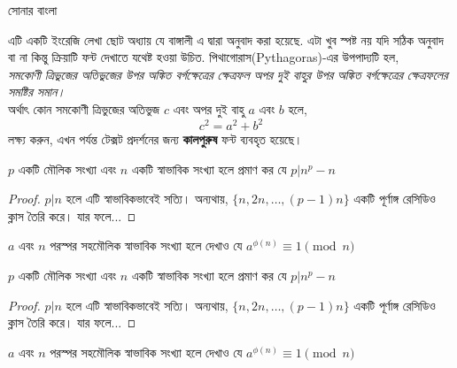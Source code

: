 \documentclass{article}
\begin{document}
{\Large সোনার বাংলা}\

এটি একটি ইংরেজি লেখা ছোট অধ্যায় যে বাঙ্গালী এ দ্বারা অনুবাদ করা হয়েছে. এটা খুব স্পষ্ট নয় যদি সঠিক অনুবাদ বা না কিন্তু ক্রিয়াটি ফন্ট দেখাতে যথেষ্ট হওয়া উচিত.
পিথাগোরাস(Pythagoras)-এর উপপাদ্যটি হল,\\
\textit{সমকোণী ত্রিভুজের অতিভুজের উপর অঙ্কিত বর্গক্ষেত্রের ক্ষেত্রফল অপর দুই বাহুর 
উপর অঙ্কিত বর্গক্ষেত্রের ক্ষেত্রফলের সমষ্টির সমান।}\\
অর্থাৎ কোন সমকোণী ত্রিভুজের অতিভুজ $c$ এবং অপর দুই বাহু $a$ এবং $b$ হলে,
\[c^2=a^2+b^2\]
লক্ষ্য করুন, এখন পর্যন্ত টেক্সট প্রদর্শনের জন্য \textbf{কালপুরুষ} ফন্ট ব্যবহৃত হয়েছে।


\begin{problem}
$p$ একটি মৌলিক সংখ্যা এবং $n$ একটি স্বাভাবিক সংখ্যা হলে প্রমাণ কর যে 
$p|n^p-n$ 
\end{problem}
\begin{proof}
$p|n$ হলে এটি স্বাভাবিকভাবেই সত্যি। অন্যথায়, $\{n,2n,\ldots,(p-1)n\}$
 একটি পূর্ণাঙ্গ রেসিডিও ক্লাস তৈরি করে। যার ফলে...
\end{proof}
\begin{problem}
$a$ এবং $n$ পরস্পর সহমৌলিক স্বাভাবিক সংখ্যা হলে দেখাও যে $a^{\phi(n)}
\equiv 1\pmod n$
\end{problem}

\begin{problem}
$p$ একটি মৌলিক সংখ্যা এবং $n$ একটি স্বাভাবিক সংখ্যা হলে প্রমাণ কর যে $p|n^p-n$ 
\end{problem}
\begin{proof}
$p|n$ হলে এটি স্বাভাবিকভাবেই সত্যি। অন্যথায়, $\{n,2n,\ldots,(p-1)n\}$ একটি
পূর্ণাঙ্গ রেসিডিও ক্লাস তৈরি করে। যার ফলে...
\end{proof}
\begin{problem}
$a$ এবং $n$ পরস্পর সহমৌলিক স্বাভাবিক সংখ্যা হলে দেখাও যে $a^{\phi(n)}\equiv 1\pmod n$
\end{problem}
\end{document}

